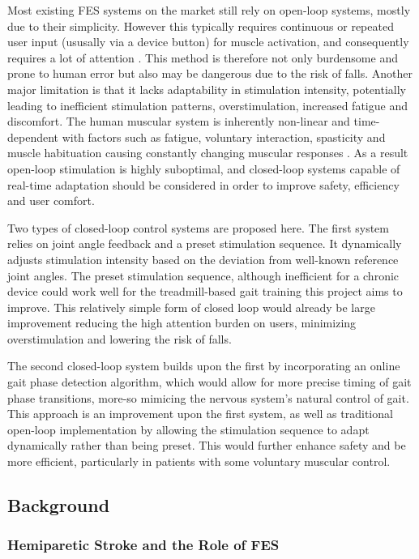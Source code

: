Most existing FES systems on the market still rely on open-loop systems, mostly due to their simplicity\cite{braz_functional_2009}. However this typically requires continuous or repeated user input (ususally via a device button) for muscle activation, and consequently requires a lot of attention \cite{hayami_development_2022}. This method is therefore not only burdensome and prone to human error but also may be dangerous due to the risk of falls. Another major limitation is that it lacks adaptability in stimulation intensity, potentially leading to inefficient stimulation patterns, overstimulation, increased fatigue and discomfort. The human muscular system is inherently non-linear and time-dependent with factors such as fatigue, voluntary interaction, spasticity and muscle habituation causing constantly changing muscular responses . As a result open-loop stimulation is highly suboptimal, and closed-loop systems capable of real-time adaptation should be considered in order to improve safety, efficiency and user comfort.

Two types of closed-loop control systems are proposed here. The first system relies on joint angle feedback and a preset stimulation sequence. It dynamically adjusts stimulation intensity based on the deviation from well-known reference joint angles. The preset stimulation sequence, although inefficient for a chronic device could work well for the treadmill-based gait training this project aims to improve. This relatively simple form of closed loop would already be large improvement reducing the high attention burden on users, minimizing overstimulation and lowering the risk of falls.  

The second closed-loop system builds upon the first by incorporating an online gait phase detection algorithm, which would allow for more precise timing of gait phase transitions, more-so mimicing the nervous system's natural control of gait. This approach is an improvement upon the first system, as well as traditional open-loop implementation by allowing the stimulation sequence to adapt dynamically rather than being preset. This would further enhance safety and be more efficient, particularly in patients with some voluntary muscular control.

\subsection{Background}

\subsubsection{Hemiparetic Stroke and the Role of FES}


